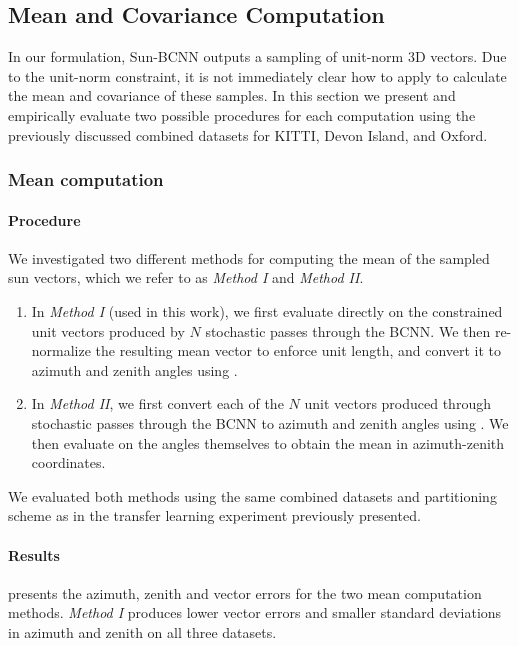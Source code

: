 \subsection{Mean and Covariance Computation}
In our formulation, Sun-BCNN outputs a sampling of unit-norm 3D vectors. 
Due to the unit-norm constraint, it is not immediately clear how to apply  to calculate the mean and covariance of these samples.
In this section we present and empirically evaluate two possible procedures for each computation using the previously discussed combined datasets for KITTI, Devon Island, and Oxford.

\subsubsection{Mean computation}
\paragraph{Procedure}
We investigated two different methods for computing the mean of the sampled sun vectors, which we refer to as \emph{Method I} and \emph{Method II}. 

\begin{enumerate} 
\item In \emph{Method I} (used in this work), we first evaluate  directly on the constrained unit vectors produced by $N$ stochastic passes through the BCNN. We then re-normalize the resulting mean vector to enforce unit length, and convert it to azimuth and zenith angles using .
\item In \emph{Method II}, we first convert each of the $N$ unit vectors produced through stochastic passes through the BCNN to azimuth and zenith angles using . We then evaluate  on the angles themselves to obtain the mean in azimuth-zenith coordinates.
\end{enumerate}

We evaluated both methods using the same combined datasets and partitioning scheme as in the transfer learning experiment previously presented.

\paragraph{Results}
 presents the azimuth, zenith and vector errors for the two mean computation methods. 
\emph{Method I} produces lower vector errors and smaller standard deviations in azimuth and zenith on all three datasets.

